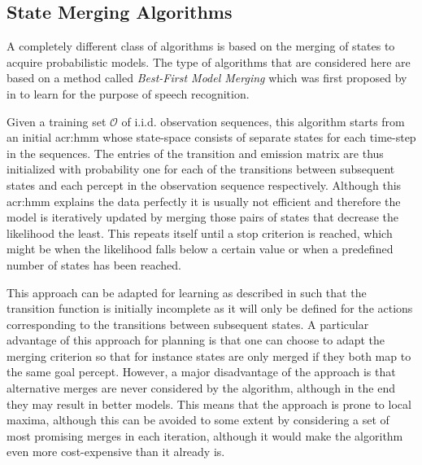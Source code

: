 
\subsection{State Merging Algorithms}
\label{sec:state-merging}

A completely different class of algorithms is based on the merging of states to acquire probabilistic models.
The type of algorithms that are considered here are based on a method called \textit{Best-First Model Merging} which was first proposed by \citeauthor{stolcke1994best} in \cite{stolcke1994best} to learn  for the purpose of speech recognition.

Given a training set $\mathcal{O}$ of i.i.d. observation sequences, this algorithm starts from an initial \acrshort{acr:hmm} whose state-space consists of separate states for each time-step in the sequences.
The entries of the transition and emission matrix are thus initialized with probability one for each of the transitions between subsequent states and each percept in the observation sequence respectively.
Although this \acrshort{acr:hmm} explains the data perfectly it is usually not efficient and therefore the model is iteratively updated by merging those pairs of states that decrease the likelihood the least.
This repeats itself until a stop criterion is reached, which might be when the likelihood falls below a certain value or when a predefined number of states has been reached.

This approach can be adapted for learning  as described in \cite{nikovski1999learning} such that the transition function is initially incomplete as it will only be defined for the actions corresponding to the transitions between subsequent states.
A particular advantage of this approach for planning is that one can choose to adapt the merging criterion so that for instance states are only merged if they both map to the same goal percept.
However, a major disadvantage of the approach is that alternative merges are never considered by the algorithm, although in the end they may result in better models.
This means that the approach is prone to local maxima, although this can be avoided to some extent by considering a set of most promising merges in each iteration, although it would make the algorithm even more cost-expensive than it already is.

